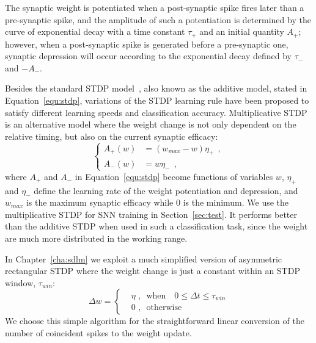 The synaptic weight is potentiated when a post-synaptic spike fires later than a pre-synaptic spike, and the amplitude of such a potentiation is determined by the curve of exponential decay with a time constant $\tau_+$ and an initial quantity $A_+$;
however, when a post-synaptic spike is generated before a pre-synaptic one, synaptic depression will occur according to the exponential decay defined by $\tau_-$ and ${-A}_-$.

Besides the standard STDP model~\citep{song2000competitive}, also known as the additive model, stated in Equation~\ref{equ:stdp}, variations of the STDP learning rule have been proposed to satisfy different learning speeds and classification accuracy.
Multiplicative STDP~\citep{morrison2008phenomenological} is an alternative model where the weight change is not only dependent on the relative timing, but also on the current synaptic efficacy:
\begin{equation}
\left\{
\begin{aligned}
A_+ (w) &=  (w_{max} - w)\eta_+~~, \\
A_- (w) &= w\eta_-~~,
\end{aligned}
\right.
\end{equation}
where $A_+$ and $A_-$ in Equation~\ref{equ:stdp} become functions of variables $w$, $\eta_+$ and $\eta_-$ define the learning rate of the weight potentiation and depression, and $w_{max}$ is the maximum synaptic efficacy while 0 is the minimum.
We use the multiplicative STDP for SNN training in Section~\ref{sec:test}.
It performs better than the additive STDP when used in such a classification task, since the weight are much more distributed in the working range.

In Chapter~\ref{cha:sdlm} we exploit a much simplified version of asymmetric rectangular STDP where the weight change is just a constant within an STDP window, $\tau_{win}$:
\begin{equation}
\Delta w = \left\{
\begin{aligned}
&\eta \textrm{~,~~when~~~} 0 \leq \Delta  t \leq \tau_{win}\\
& 0 \textrm{~,~~otherwise}
\end{aligned}
\right.
\end{equation}
We choose this simple algorithm for the straightforward linear conversion of the number of coincident spikes to the weight update.
 

